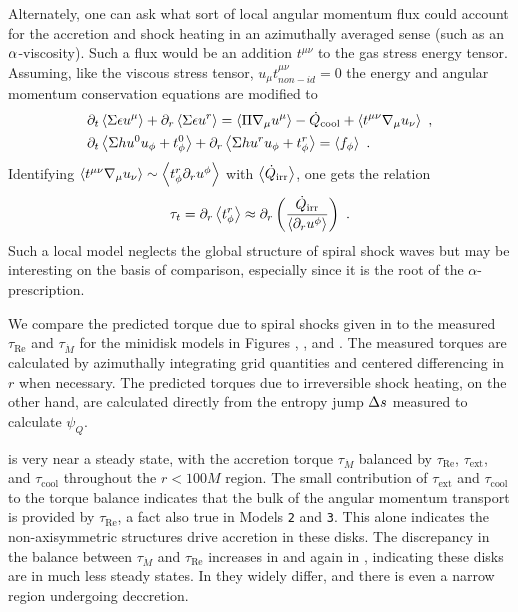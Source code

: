 Alternately, one can ask what sort of local angular momentum flux could account for the accretion and shock heating in an azimuthally averaged sense (such as an $\alpha$-viscosity).  Such a flux would be an addition $t^{\mu\nu}$ to the gas stress energy tensor.  Assuming, like the viscous stress tensor, $u_\mu t^{\mu\nu}_{non-id} = 0$ the energy and angular momentum conservation equations are modified to
\begin{align}
	&\partial_t \left \langle \Sigma \epsilon u^\mu \right \rangle + \partial_r \left \langle \Sigma \epsilon u^r \right \rangle = \left \langle \Pi \nabla_\mu u^\mu \right \rangle - \dot{Q}_\text{cool} + \left \langle t^{\mu\nu} \nabla_\mu u_\nu \right \rangle \ ,\\
	&\partial_t \left \langle \Sigma h u^0 u_\phi + t^0_\phi \right \rangle + \partial_r \left \langle \Sigma h u^r u_\phi + t^r_\phi \right \rangle = \left \langle f_\phi \right \rangle \ .
\end{align}
Identifying $\left \langle t^{\mu\nu} \nabla_\mu u_\nu \right \rangle \sim \left \langle t^r_\phi \partial_r u^\phi \right \rangle$ with $\left \langle \dot{Q}_\text{irr} \right \rangle$, one gets the relation
\begin{equation}
	\tau_{t} = \partial_r \ave{t^r_\phi} \approx \partial_r \left(\frac{\dot{Q}_\text{irr}}{\ave{\partial_r u^\phi}} \right)\ . \eqlabel{tauLoc}
\end{equation}
Such a local model neglects the global structure of spiral shock waves but may be interesting on the basis of comparison,  especially since it is the root of the $\alpha$-prescription.

We compare the predicted torque due to spiral shocks given in  to the measured $\tau_\text{Re}$ and $\tau_{\dot{M}}$ for the minidisk models in Figures , , and .  The measured torques are calculated by azimuthally integrating grid quantities and centered differencing in $r$ when necessary.  The predicted torques due to irreversible shock heating, on the other hand, are calculated directly from the entropy jump $\Delta s$ measured to calculate $\psi_Q$.  

 is very near a steady state, with the accretion torque $\tau_{\dot{M}}$ balanced by $\tau_\text{Re}$, $\tau_\text{ext}$, and $\tau_\text{cool}$ throughout the $r < 100M$ region.  The small contribution of $\tau_\text{ext}$ and $\tau_\text{cool}$ to the torque balance indicates that the bulk of the angular momentum transport is provided by $\tau_\text{Re}$, a fact also true in Models \texttt{2} and \texttt{3}.  This alone indicates the non-axisymmetric structures drive accretion in these disks.  The discrepancy in the balance between $\tau_{\dot{M}}$ and $\tau_\text{Re}$ increases in  and again in , indicating these disks are in much less steady states.  In  they widely differ, and there is even a narrow region undergoing deccretion.  

